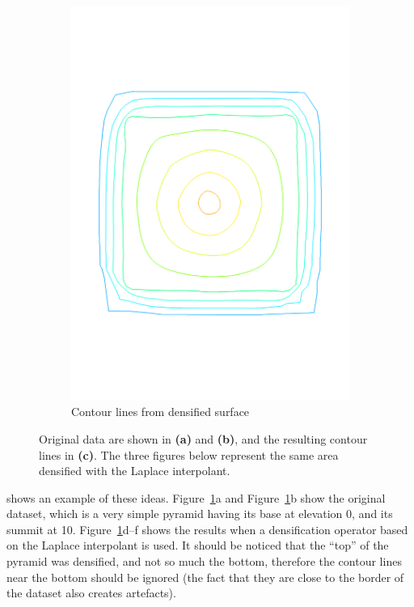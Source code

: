 \begin{figure}
\begin{subfigure}[b]{0.3\linewidth}
    \includegraphics[width=\textwidth]{figs/pyramid_v_cl}
    \caption{Contour lines from densified surface}
  \end{subfigure}  
  \caption{Original data are shown in \textbf{(a)} and \textbf{(b)}, and the resulting contour lines in \textbf{(c)}. The three figures below represent the same area densified with the Laplace interpolant.}
\label{fig:interpol_smooth}
\end{figure}
shows an example of these ideas. 
Figure~\ref{fig:interpol_smooth}a and Figure~\ref{fig:interpol_smooth}b show the original dataset, which is a very simple pyramid having its base at elevation 0, and its summit at 10. 
Figure~\ref{fig:interpol_smooth}d--f shows the results when a densification operator based on the Laplace interpolant is used. 
It should be noticed that the ``top'' of the pyramid was densified, and not so much the bottom, therefore the contour lines near the bottom should be ignored (the fact that they are close to the border of the dataset also creates artefacts).


